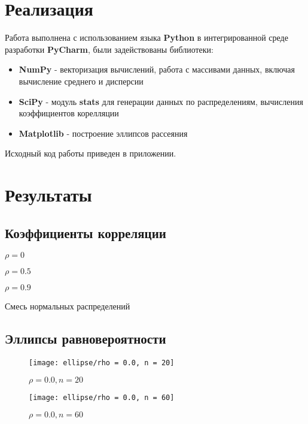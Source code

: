 \documentclass[12pt,a4paper]{article}
\begin{document}
\section{Реализация}
\label{sec:impl}
Работа выполнена с использованием языка \textbf{Python} в интегрированной среде разработки \textbf{PyCharm}, были задействованы библиотеки:

\begin{itemize}
	\item \textbf{NumPy} - векторизация вычислений, работа с массивами данных, включая вычисление среднего и дисперсии
	\item \textbf{SciPy} - модуль \textbf{stats} для генерации данных по распределениям, вычисления коэффициентов корелляции
	\item \textbf{Matplotlib} - построение эллипсов рассеяния
\end{itemize}

Исходный код работы приведен в приложении. 
\pagebreak

\section{Результаты}
\subsection{Коэффициенты корреляции}
\begin{table}[h!]
	\centering
	
	\caption{$\rho = 0$}
\end{table}
\begin{table}[h!]
	\centering
	
	\caption{$\rho = 0.5$}
\end{table}
\pagebreak

\begin{table}[h!]
	\centering
	
	\caption{$\rho = 0.9$}
\end{table}

\begin{table}[h!]
	\centering
	
	\caption{Смесь нормальных распределений}
\end{table}
\pagebreak

\subsection{Эллипсы равновероятности}
\begin{figure}[h!]
	\centering
	\texttt{[image: ellipse/rho = 0.0, n = 20]}
	\caption{$\rho = 0.0, n = 20$}
	\label{fig:image1}
\end{figure}
\begin{figure}[h!]
	\centering
	\texttt{[image: ellipse/rho = 0.0, n = 60]}
	\caption{$\rho = 0.0, n = 60$}
	\label{fig:image2}
\end{figure}
\pagebreak
\end{document}
